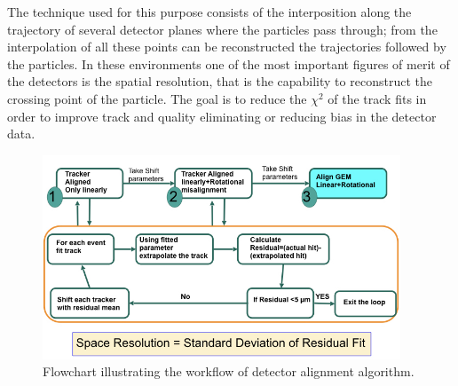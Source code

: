 The technique used for this purpose consists of the interposition along the trajectory of several detector planes where the particles pass through; from the interpolation of all these points can be reconstructed the trajectories followed by the particles.
In these environments one of the most important figures of merit of the detectors is the spatial resolution, that is the capability to reconstruct the crossing point of the particle.
The goal is to reduce the $\chi^{2}$ of the track fits in order to improve track and quality eliminating or reducing bias in the detector data.

\begin{figure}[htbp]
    \centering
    \includegraphics[width=0.95\textwidth]{figures/GEM/GEM_Alignment_FlowChart.jpeg}
    \caption{Flowchart illustrating the workflow of detector alignment algorithm.}
    \label{fig:alignment}
\end{figure}

